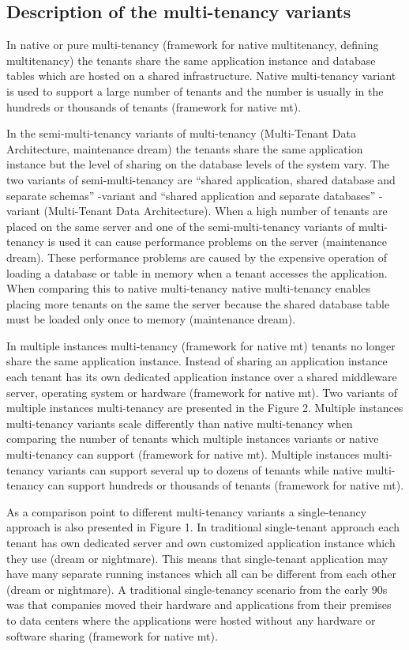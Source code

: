 \documentclass[conference]{sasmoota2017}
\begin{document}
\subsection{Description of the multi-tenancy variants}

In native or pure multi-tenancy (framework for native multitenancy, defining multitenancy) the tenants share the same application instance and database tables which are hosted on a shared infrastructure. Native multi-tenancy variant is used to support a large number of tenants and the number is usually in the hundreds or thousands of tenants (framework for native mt). 

In the semi-multi-tenancy variants of multi-tenancy (Multi-Tenant Data Architecture, maintenance dream) the tenants share the same application instance but the level of sharing on the database levels of the system vary. The two variants of semi-multi-tenancy are “shared application, shared database and separate schemas” -variant and “shared application and separate databases” -variant (Multi-Tenant Data Architecture). When a high number of tenants are placed on the same server and one of the semi-multi-tenancy variants of multi-tenancy is used it can cause performance problems on the server (maintenance dream). These performance problems are caused by the expensive operation of loading a database or table in memory when a tenant accesses the application. When comparing this to native multi-tenancy native multi-tenancy enables placing more tenants on the same the server because the shared database table must be loaded only once to memory (maintenance dream).

In multiple instances multi-tenancy (framework for native mt) tenants no longer share the same application instance. Instead of sharing an application instance each tenant has its own dedicated application instance over a shared middleware server, operating system or hardware (framework for native mt). Two variants of multiple instances multi-tenancy are presented in the Figure 2. Multiple instances multi-tenancy variants scale differently than native multi-tenancy when comparing the number of tenants which multiple instances variants or native multi-tenancy can support (framework for native mt). Multiple instances multi-tenancy variants can support several up to dozens of tenants while native multi-tenancy can support hundreds or thousands of tenants (framework for native mt).

As a comparison point to different multi-tenancy variants a single-tenancy approach is also presented in Figure 1. In traditional single-tenant approach each tenant has own dedicated server and own customized application instance which they use (dream or nightmare). This means that single-tenant application may have many separate running instances which all can be different from each other (dream or nightmare). A traditional single-tenancy scenario from the early 90s was that companies moved their hardware and applications from their premises to data centers where the applications were hosted without any hardware or software sharing (framework for native mt). 
\end{document}
